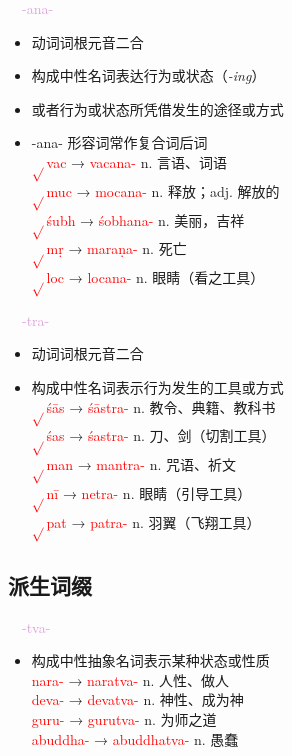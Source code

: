 \documentclass[17pt]{beamer}
\newcommand{\verbroot}[1]{\textcolor{red}{$\sqrt{}$#1}}
\newcommand{\nounstem}[1]{\textcolor{red}{#1\nobreakdash-}}
\newcommand{\pratyaya}[1]{\mbox{\textcolor{Plum}{#1}}}
\begin{document}
\begin{frame}{\insertsubsection~~\pratyaya{-ana-}}
  \small
  \begin{itemize}
    \item 动词词根元音二合
    \item 构成中性名词表达行为或状态（\textit{-ing}）
    \item 或者行为或状态所凭借发生的途径或方式
    \item \nobreakdash-ana- 形容词常作复合词后词
    \bigskip
    \\ \verbroot{vac} → \nounstem{vacana} n. 言语、词语
    \\ \verbroot{muc} → \nounstem{mocana} n. 释放；adj. 解放的
    \\ \verbroot{śubh} → \nounstem{śobhana} n. 美丽，吉祥
    \\ \verbroot{mṛ} → \nounstem{maraṇa} n. 死亡
    \\ \verbroot{loc} → \nounstem{locana} n. 眼睛（看之工具）
  \end{itemize}
\end{frame}


\begin{frame}{\insertsubsection~~\pratyaya{-tra-}}
  \small
  \begin{itemize}
    \item 动词词根元音二合
    \item 构成中性名词表示行为发生的工具或方式
    \bigskip
    \\ \verbroot{śās} → \nounstem{śāstra} n. 教令、典籍、教科书
    \\ \verbroot{śas} → \nounstem{śastra} n. 刀、剑（切割工具）
    \\ \verbroot{man} → \nounstem{mantra} n. 咒语、祈文
    \\ \verbroot{nī} → \nounstem{netra} n. 眼睛（引导工具）
    \\ \verbroot{pat} → \nounstem{patra} n. 羽翼（飞翔工具）
  \end{itemize}
\end{frame}

\subsection{派生词缀}

\begin{frame}{\insertsubsection~~\pratyaya{-tva-}}
  \small
  \begin{itemize}
    \item 构成中性抽象名词表示某种状态或性质
    \bigskip
    \\ \nounstem{nara} → \nounstem{naratva} n. 人性、做人
    \\ \nounstem{deva} → \nounstem{devatva} n. 神性、成为神
    \\ \nounstem{guru} → \nounstem{gurutva} n. 为师之道
    \\ \nounstem{abuddha} → \nounstem{abuddhatva} n. 愚蠢
  \end{itemize}
\end{frame}
\end{document}
